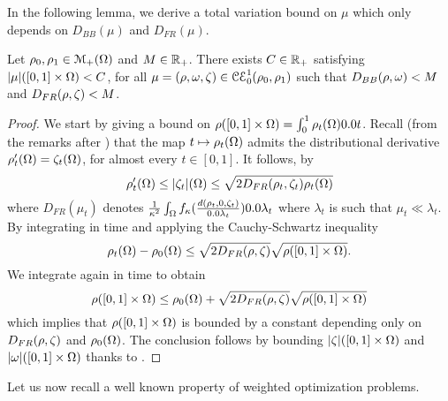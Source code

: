 In the following lemma, we derive a total variation bound on $\mu$ which only depends on $D_{BB}(\mu)$ and $D_{FR}(\mu)$.

\begin{lemma}
Let $\rho_0, \rho_1 \in \mathcal{M}_+(\Omega)$ and $M\in \mathbb{R}_+$. There exists $C\in \mathbb{R}_+$ satisfying  $|\mu|([0,1]\times \Omega) < C$, for all $\mu=(\rho,\omega,\zeta)\in \mathcal{CE}_0^1(\rho_0,\rho_1)$ such that $D_{BB}(\rho,\omega) <M$ and $D_{FR}(\rho,\zeta) <M$.
\end{lemma}

\begin{proof}
We start by giving a bound on $\rho([0,1] \times \Om)=\int_0^1 \rho_t(\Om) \d t$. Recall (from the remarks after ) that the map $t \mapsto \rho_t(\Omega)$ admits the distributional derivative $\rho'_t (\Omega) = \zeta_t(\Omega)$, for almost every $t\in[0,1]$. It follows, by 
\[
\rho'_t (\Omega) \leq |\zeta_t \vert(\Omega) \leq \sqrt{2 D_{FR}(\rho_t,\zeta_t) \rho_t(\Omega)}
\]
where $D_{FR}(\mu_t)$ denotes $\frac{1}{\kappa^2} \int_{\Om} \fonc(\frac{d(\rho_t,0,\Z_t)}{\d\lambda_t})\d\lambda_t$ where $\lambda_t$ is such that $\mu_t \ll \lambda_t$. By integrating in time and applying the Cauchy-Schwartz inequality
\[
\rho_t(\Omega)-\rho_0(\Omega) 
\leq \sqrt{2D_{FR}(\rho,\zeta)} \sqrt{ \rho([0,1] \times \Omega)} .
\]
We integrate again in time to obtain 
\[  
	\rho([0,1] \times \Omega) \leq \rho_0 (\Omega) + \sqrt{2D_{FR}(\rho,\zeta)} \sqrt{ \rho([0,1] \times \Omega)} 
\]
which implies that $ \rho([0,1] \times \Omega)$ is bounded by a constant depending only on $D_{FR}(\rho,\zeta)$ and $\rho_0(\Omega)$. 
The conclusion follows by bounding  $|\zeta|([0,1]\times \Omega)$ and $|\omega|([0,1]\times \Omega)$ thanks to .
\end{proof}

Let us now recall a well known property of weighted optimization problems.

